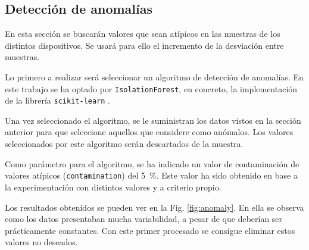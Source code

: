 \iffalse
\subsection{Detección de anomalías}

En esta sección se buscarán valores que sean atípicos en las muestras de los distintos dispositivos. Se usará para ello el incremento de la desviación entre muestras. 

Lo primero a realizar será seleccionar un algoritmo de detección de anomalías. En este trabajo se ha optado por \texttt{IsolationForest}, en concreto, la implementación de la librería \texttt{scikit-learn} \cite{scikitisolation}.

Una vez seleccionado el algoritmo, se le suministran los datos vistos en la sección anterior para que seleccione aquellos que considere como anómalos. Los valores seleccionados por este algoritmo serán descartados de la muestra.

Como parámetro para el algoritmo, se ha indicado un valor de contaminación de valores atípicos (\texttt{contamination}) del \SI{5}{\percent}. Este valor ha sido obtenido en base a la experimentación con distintos valores y a criterio propio.

Los resultados obtenidos se pueden ver en la Fig. \ref{fig:anomaly}. En ella se observa como los datos presentaban mucha variabilidad, a pesar de que deberían ser prácticamente constantes. Con este primer procesado se consigue eliminar estos valores no deseados.


